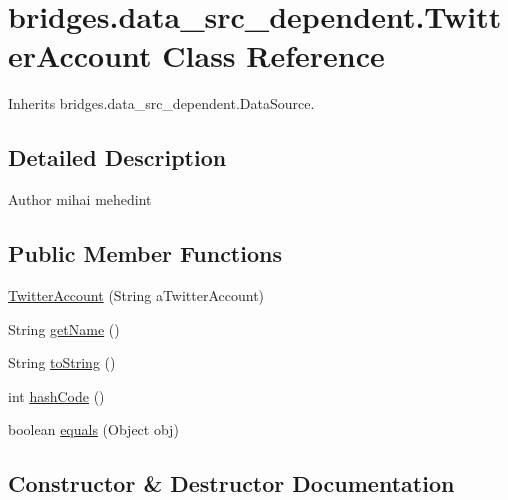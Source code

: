 \hypertarget{classbridges_1_1data__src__dependent_1_1_twitter_account}{}\section{bridges.\+data\+\_\+src\+\_\+dependent.\+Twitter\+Account Class Reference}
\label{classbridges_1_1data__src__dependent_1_1_twitter_account}


Inherits bridges.\+data\+\_\+src\+\_\+dependent.\+Data\+Source.



\subsection{Detailed Description}
\begin{DoxyAuthor}{Author}
mihai mehedint 
\end{DoxyAuthor}
\subsection*{Public Member Functions}
\begin{DoxyCompactItemize}
\item 
\mbox{\hyperlink{classbridges_1_1data__src__dependent_1_1_twitter_account_a725febd1fcbbee710fd638d6b4a9db62}{Twitter\+Account}} (String a\+Twitter\+Account)
\item 
String \mbox{\hyperlink{classbridges_1_1data__src__dependent_1_1_twitter_account_a92c536bd6a65c51d84a77d772775e20c}{get\+Name}} ()
\item 
String \mbox{\hyperlink{classbridges_1_1data__src__dependent_1_1_twitter_account_af4dd5dfe1a1556fa57f917fb24d8d6f2}{to\+String}} ()
\item 
int \mbox{\hyperlink{classbridges_1_1data__src__dependent_1_1_twitter_account_a2f89f6f336b1bd39f0cf3aa444c76885}{hash\+Code}} ()
\item 
boolean \mbox{\hyperlink{classbridges_1_1data__src__dependent_1_1_twitter_account_a2bddc8fe99b9096fe90968d805fa91e1}{equals}} (Object obj)
\end{DoxyCompactItemize}


\subsection{Constructor \& Destructor Documentation}
\mbox{\label{classbridges_1_1data__src__dependent_1_1_twitter_account_a725febd1fcbbee710fd638d6b4a9db62}} 
